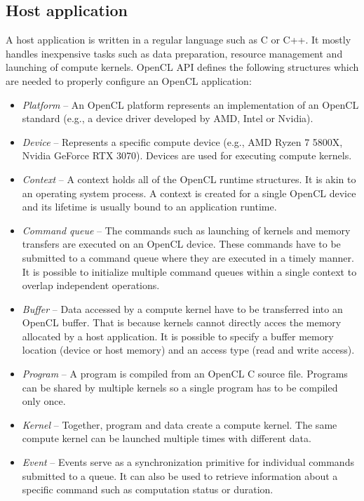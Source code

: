 \documentclass[
  digital,     %
  oneside,     %
  nosansbold,  %
  nocolorbold, %
  lof,         %
  lot,         %
  nocover
]{fithesis4}
\begin{document}
\subsection{Host application}
A host application is written in a regular language such as C or C++. It mostly handles inexpensive tasks such as data preparation, resource management and launching of compute kernels. OpenCL API defines the following structures which are needed to properly configure an OpenCL application:
\begin{itemize}
    \item \textit{Platform} -- An OpenCL platform represents an implementation of an OpenCL standard (e.g., a device driver developed by AMD, Intel or Nvidia).
    \item \textit{Device} -- Represents a specific compute device (e.g., AMD Ryzen 7 5800X, Nvidia GeForce RTX 3070). Devices are used for executing compute kernels.
    \item \textit{Context} -- A context holds all of the OpenCL runtime structures. It is akin to an operating system process. A context is created for a single OpenCL device and its lifetime is usually bound to an application runtime.
    \item \textit{Command queue} -- The commands such as launching of kernels and memory transfers are executed on an OpenCL device. These commands have to be submitted to a command queue where they are executed in a timely manner. It is possible to initialize multiple command queues within a single context to overlap independent operations.
    \item \textit{Buffer} -- Data accessed by a compute kernel have to be transferred into an OpenCL buffer. That is because kernels cannot directly acces the memory allocated by a host application. It is possible to specify a buffer memory location (device or host memory) and an access type (read and write access).
    \item \textit{Program} -- A program is compiled from an OpenCL C source file. Programs can be shared by multiple kernels so a single program has to be compiled only once.
    \item \textit{Kernel} -- Together, program and data create a compute kernel. The same compute kernel can be launched multiple times with different data.
    \item \textit{Event} -- Events serve as a synchronization primitive for individual commands submitted to a queue. It can also be used to retrieve information about a specific command such as computation status or duration.
\end{itemize}
\end{document}
